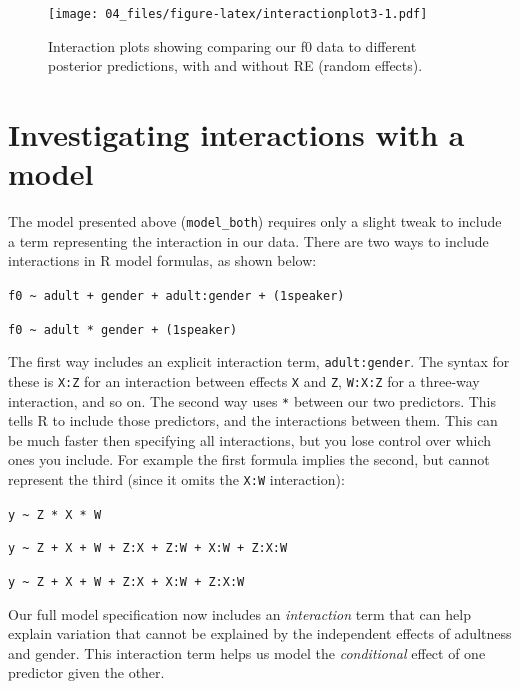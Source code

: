\documentclass[
]{book}
\begin{document}
\begin{figure}
\centering
\texttt{[image: 04\_files/figure-latex/interactionplot3-1.pdf]}
\caption{\label{fig:interactionplot3}Interaction plots showing comparing our f0 data to different posterior predictions, with and without RE (random effects).}
\end{figure}

\hypertarget{investigating-interactions-with-a-model}{%
\section{Investigating interactions with a model}\label{investigating-interactions-with-a-model}}

The model presented above (\texttt{model\_both}) requires only a slight tweak to include a term representing the interaction in our data. There are two ways to include interactions in R model formulas, as shown below:

\texttt{f0\ \textasciitilde{}\ adult\ +\ gender\ +\ adult:gender\ +\ (1\textbar{}speaker)}
~

\texttt{f0\ \textasciitilde{}\ adult\ *\ gender\ +\ (1\textbar{}speaker)}

The first way includes an explicit interaction term, \texttt{adult:gender}. The syntax for these is \texttt{X:Z} for an interaction between effects \texttt{X} and \texttt{Z}, \texttt{W:X:Z} for a three-way interaction, and so on. The second way uses \texttt{*} between our two predictors. This tells R to include those predictors, and the interactions between them. This can be much faster then specifying all interactions, but you lose control over which ones you include. For example the first formula implies the second, but cannot represent the third (since it omits the \texttt{X:W} interaction):

\texttt{y\ \textasciitilde{}\ Z\ *\ X\ *\ W}
~

\texttt{y\ \textasciitilde{}\ Z\ +\ X\ +\ W\ +\ Z:X\ +\ Z:W\ +\ X:W\ +\ Z:X:W}
~

\texttt{y\ \textasciitilde{}\ Z\ +\ X\ +\ W\ +\ Z:X\ +\ X:W\ +\ Z:X:W}

Our full model specification now includes an \emph{interaction} term that can help explain variation that cannot be explained by the independent effects of adultness and gender. This interaction term helps us model the \emph{conditional} effect of one predictor given the other.
\end{document}

